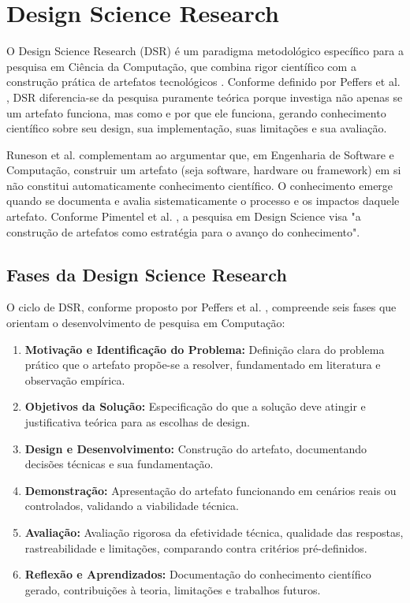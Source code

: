 \section{Design Science Research}

O Design Science Research (DSR) é um paradigma metodológico específico para a pesquisa em Ciência da Computação, que combina rigor científico com a construção prática de artefatos tecnológicos \cite{Peffers2007}. Conforme definido por Peffers et al. \cite{Peffers2007}, DSR diferencia-se da pesquisa puramente teórica porque investiga não apenas se um artefato funciona, mas como e por que ele funciona, gerando conhecimento científico sobre seu design, sua implementação, suas limitações e sua avaliação.

Runeson et al. \cite{Runeson2020} complementam ao argumentar que, em Engenharia de Software e Computação, construir um artefato (seja software, hardware ou framework) em si não constitui automaticamente conhecimento científico. O conhecimento emerge quando se documenta e avalia sistematicamente o processo e os impactos daquele artefato. Conforme Pimentel et al. \cite{Pimentel2020}, a pesquisa em Design Science visa "a construção de artefatos como estratégia para o avanço do conhecimento".

\subsection{Fases da Design Science Research}

O ciclo de DSR, conforme proposto por Peffers et al. \cite{Peffers2007}, compreende seis fases que orientam o desenvolvimento de pesquisa em Computação:

\begin{enumerate}
\item \textbf{Motivação e Identificação do Problema:} Definição clara do problema prático que o artefato propõe-se a resolver, fundamentado em literatura e observação empírica.
\item \textbf{Objetivos da Solução:} Especificação do que a solução deve atingir e justificativa teórica para as escolhas de design.
\item \textbf{Design e Desenvolvimento:} Construção do artefato, documentando decisões técnicas e sua fundamentação.
\item \textbf{Demonstração:} Apresentação do artefato funcionando em cenários reais ou controlados, validando a viabilidade técnica.
\item \textbf{Avaliação:} Avaliação rigorosa da efetividade técnica, qualidade das respostas, rastreabilidade e limitações, comparando contra critérios pré-definidos.
\item \textbf{Reflexão e Aprendizados:} Documentação do conhecimento científico gerado, contribuições à teoria, limitações e trabalhos futuros.
\end{enumerate}

